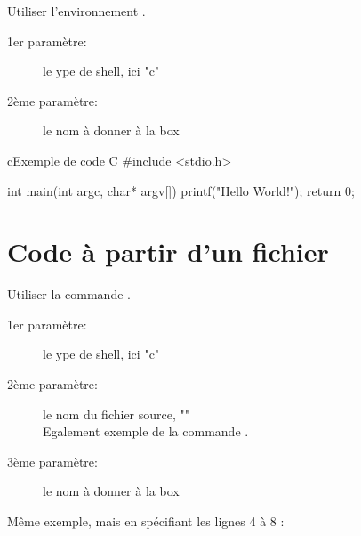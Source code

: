 Utiliser l'environnement .
\begin{description}
 \item[1er paramètre:] le ype de shell, ici "c"
 \item[2ème paramètre:] le nom à donner à la box
\end{description}

\begin{sourcebox}{c}{Exemple de code C}
#include <stdio.h>

int main(int argc, char* argv[])
{
   printf("Hello World!\n");
   return 0;
}
\end{sourcebox}



\section{Code à partir d'un fichier}

Utiliser la commande .
\begin{description}
 \item[1er paramètre:] le ype de shell, ici "c"
 \item[2ème paramètre:] le nom du fichier source, ""\\ Egalement exemple de la commande .
 \item[3ème paramètre:] le nom à donner à la box
\end{description}



Même exemple, mais en spécifiant les lignes 4 à 8 :




